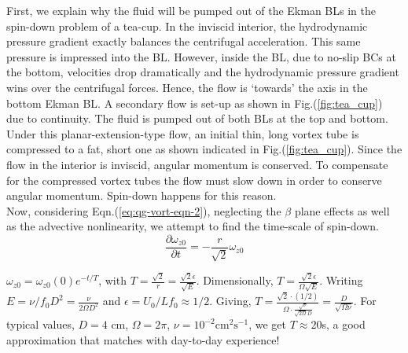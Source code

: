 \documentclass{article}
\newcommand{\pd}[2]{\frac{\partial{#1}}{\partial{#2}}}
\begin{document}
First, we explain why the fluid will be pumped out of the Ekman BLs in the spin-down problem of a tea-cup. In the inviscid interior, the hydrodynamic pressure gradient exactly balances the centrifugal acceleration. This same pressure is impressed into the BL. However, inside the BL, due to no-slip BCs at the bottom, velocities drop dramatically and the hydrodynamic pressure gradient wins over the centrifugal forces. Hence, the flow is `towards' the axis in the bottom Ekman BL. A secondary flow is set-up as shown in Fig.(\ref{fig:tea_cup}) due to continuity. The fluid is pumped out of both BLs at the top and bottom. Under this planar-extension-type flow, an initial thin, long vortex tube is compressed to a fat, short one as shown indicated in Fig.(\ref{fig:tea_cup}). Since the flow in the interior is inviscid, angular momentum is conserved. To compensate for the compressed vortex tubes the flow must slow down in order to conserve angular momentum. Spin-down happens for this reason. \\
%
Now, considering Eqn.(\ref{eq:qg-vort-eqn-2}), neglecting the $\beta$ plane effects as well as the advective nonlinearity, we attempt to find the time-scale of spin-down. 
\begin{equation}
 \pd{\omega_{z0}}{t} = - \frac{r}{\sqrt{2}}\omega_{z0} 
\end{equation}

$\omega_{z0} = \omega_{z0}(0)e^{-t/T}$, with $T = \frac{\sqrt{2}}{r} = \frac{\sqrt{2}\epsilon}{\sqrt{E}}$. Dimensionally, $T = \frac{\sqrt{2}\epsilon}{\Omega\sqrt{E}}$. Writing $E = \nu/f_{0}D^{2} = \frac{\nu}{2\Omega D^{2}}$ and $\epsilon = U_{0}/Lf_{0} \approx 1/2$. Giving, $T = \frac{\sqrt{2}\cdot (1/2)}{\Omega \cdot \frac{\sqrt{\nu}}{\sqrt{2\Omega}D}}  = \frac{D}{\sqrt{\Omega \nu}}$. For typical values, $D = 4$ cm, $\Omega = 2\pi$, $\nu = 10^{-2} \textrm{cm}^{2}\textrm{s}^{-1}$, we get $T \approx 20$s, a good approximation that matches with day-to-day experience!



 \if@openright\cleardoublepage\else\clearpage\fi
 \cleardoublepage
 \pagestyle{empty}
\end{document}
